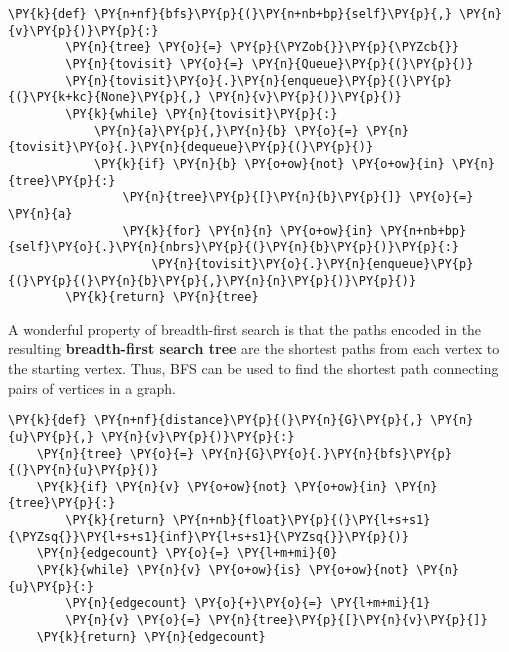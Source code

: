 \begin{Verbatim}[commandchars=\\\{\}]
    \PY{k}{def} \PY{n+nf}{bfs}\PY{p}{(}\PY{n+nb+bp}{self}\PY{p}{,} \PY{n}{v}\PY{p}{)}\PY{p}{:}
        \PY{n}{tree} \PY{o}{=} \PY{p}{\PYZob{}}\PY{p}{\PYZcb{}}
        \PY{n}{tovisit} \PY{o}{=} \PY{n}{Queue}\PY{p}{(}\PY{p}{)}
        \PY{n}{tovisit}\PY{o}{.}\PY{n}{enqueue}\PY{p}{(}\PY{p}{(}\PY{k+kc}{None}\PY{p}{,} \PY{n}{v}\PY{p}{)}\PY{p}{)}
        \PY{k}{while} \PY{n}{tovisit}\PY{p}{:}
            \PY{n}{a}\PY{p}{,}\PY{n}{b} \PY{o}{=} \PY{n}{tovisit}\PY{o}{.}\PY{n}{dequeue}\PY{p}{(}\PY{p}{)}
            \PY{k}{if} \PY{n}{b} \PY{o+ow}{not} \PY{o+ow}{in} \PY{n}{tree}\PY{p}{:}
                \PY{n}{tree}\PY{p}{[}\PY{n}{b}\PY{p}{]} \PY{o}{=} \PY{n}{a}
                \PY{k}{for} \PY{n}{n} \PY{o+ow}{in} \PY{n+nb+bp}{self}\PY{o}{.}\PY{n}{nbrs}\PY{p}{(}\PY{n}{b}\PY{p}{)}\PY{p}{:}
                    \PY{n}{tovisit}\PY{o}{.}\PY{n}{enqueue}\PY{p}{(}\PY{p}{(}\PY{n}{b}\PY{p}{,}\PY{n}{n}\PY{p}{)}\PY{p}{)}
        \PY{k}{return} \PY{n}{tree}
\end{Verbatim}



A wonderful property of breadth-first search is that the paths encoded in the resulting \textbf{breadth-first search tree} are the shortest paths from each vertex to the starting vertex.
Thus, BFS can be used to find the shortest path connecting pairs of vertices in a graph.

\begin{Verbatim}[commandchars=\\\{\}]
\PY{k}{def} \PY{n+nf}{distance}\PY{p}{(}\PY{n}{G}\PY{p}{,} \PY{n}{u}\PY{p}{,} \PY{n}{v}\PY{p}{)}\PY{p}{:}
    \PY{n}{tree} \PY{o}{=} \PY{n}{G}\PY{o}{.}\PY{n}{bfs}\PY{p}{(}\PY{n}{u}\PY{p}{)}
    \PY{k}{if} \PY{n}{v} \PY{o+ow}{not} \PY{o+ow}{in} \PY{n}{tree}\PY{p}{:}
        \PY{k}{return} \PY{n+nb}{float}\PY{p}{(}\PY{l+s+s1}{\PYZsq{}}\PY{l+s+s1}{inf}\PY{l+s+s1}{\PYZsq{}}\PY{p}{)}
    \PY{n}{edgecount} \PY{o}{=} \PY{l+m+mi}{0}
    \PY{k}{while} \PY{n}{v} \PY{o+ow}{is} \PY{o+ow}{not} \PY{n}{u}\PY{p}{:}
        \PY{n}{edgecount} \PY{o}{+}\PY{o}{=} \PY{l+m+mi}{1}
        \PY{n}{v} \PY{o}{=} \PY{n}{tree}\PY{p}{[}\PY{n}{v}\PY{p}{]}
    \PY{k}{return} \PY{n}{edgecount}
\end{Verbatim}


